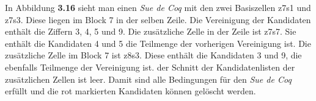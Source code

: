 In Abbildung \textbf{3.16} sieht man einen \textit{Sue de Coq} mit den zwei Basiszellen z7s1 und z7s3. Diese liegen im Block 7 in der selben Zeile. Die Vereinigung der Kandidaten enthält die Ziffern 3, 4, 5 und 9. Die zusätzliche Zelle in der Zeile ist z7s7. Sie enthält die Kandidaten 4 und 5 die Teilmenge der vorherigen Vereinigung ist. Die zusätzliche Zelle im Block 7 ist z8s3. Diese enthält die Kandidaten 3 und 9, die ebenfalls Teilmenge der Vereinigung ist. der Schnitt der Kandidatenlisten der zusätzlichen Zellen ist leer. Damit sind alle Bedingungen für den \textit{Sue de Coq} erfüllt und die rot markierten Kandidaten können gelöscht werden.